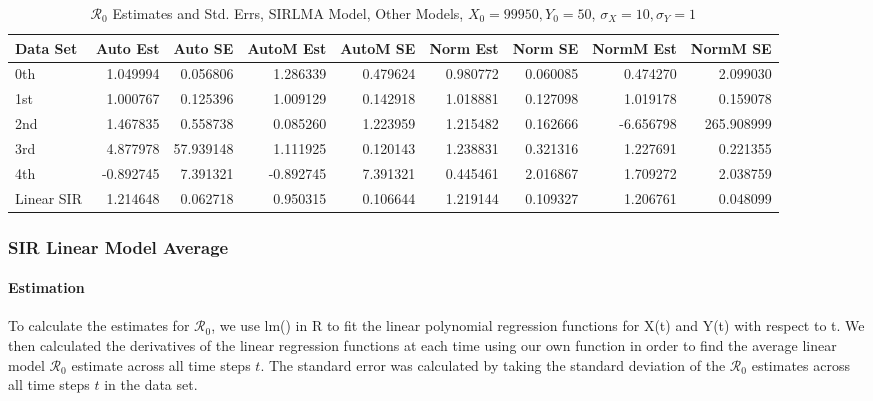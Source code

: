 \documentclass[12pt]{article}
\newcommand{\rr}{\ensuremath{\mathcal{R}_0}}
\begin{document}
\begin{table}[H]
	
	\caption{$\rr$ Estimates and Std. Errs, SIRLMA Model,
		Other Models, $X_0 = 99950, Y_0 = 50$, 
		$\sigma_X = 10, \sigma_Y = 1$}
	\begin{footnotesize}
		\hskip -1cm
		\begin{tabular}{l|r|r|r|r|r|r|r|r}
			\hline
			Data Set & Auto Est & Auto SE & AutoM Est & AutoM SE & Norm Est & Norm SE & NormM Est & NormM SE\\
			\hline
			0th & 1.049994 & 0.056806 & 1.286339 & 0.479624 & 0.980772 & 0.060085 & 0.474270 & 2.099030\\
			\hline
			1st & 1.000767 & 0.125396 & 1.009129 & 0.142918 & 1.018881 & 0.127098 & 1.019178 & 0.159078\\
			\hline
			2nd & 1.467835 & 0.558738 & 0.085260 & 1.223959 & 1.215482 & 0.162666 & -6.656798 & 265.908999\\
			\hline
			3rd & 4.877978 & 57.939148 & 1.111925 & 0.120143 & 1.238831 & 0.321316 & 1.227691 & 0.221355\\
			\hline
			4th & -0.892745 & 7.391321 & -0.892745 & 7.391321 & 0.445461 & 2.016867 & 1.709272 & 2.038759\\
			\hline
			Linear SIR & 1.214648 & 0.062718 & 0.950315 & 0.106644 & 1.219144 & 0.109327 & 1.206761 & 0.048099\\
			\hline
		\end{tabular}
	\end{footnotesize}
\end{table}

\subsubsection{SIR Linear Model Average}

\paragraph{Estimation}

To calculate the estimates for $\rr$, we use lm() in R to fit the linear polynomial regression functions for X(t) and Y(t) with respect to t. We then calculated the derivatives of the linear regression functions at each time using our own function in order to find the average linear model $\rr$ estimate across all time steps $t$. The standard error was calculated by taking the standard deviation of the $\rr$ estimates across all time steps $t$ in the data set.
\end{document}
